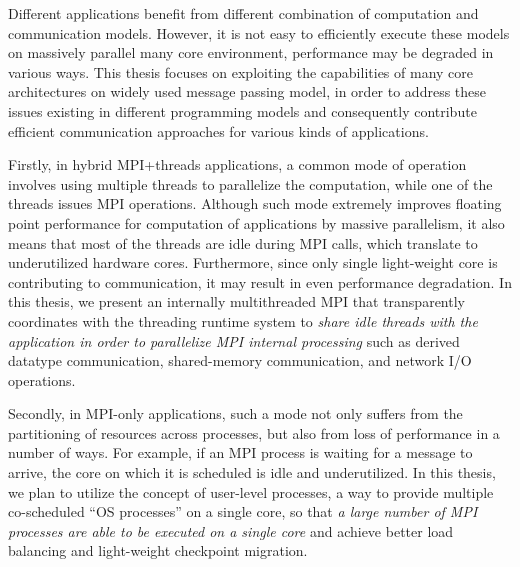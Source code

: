 Different applications benefit from different combination of computation and 
communication models. However, it is not easy to efficiently execute these models
on massively parallel many core environment, performance may be degraded in various
ways. This thesis focuses on exploiting the capabilities of many core architectures
on widely used message passing model, in order to address these issues existing 
in different programming models and consequently contribute efficient communication 
approaches for various kinds of applications. 

Firstly, in hybrid MPI+threads applications, a common mode of operation involves 
using multiple threads to parallelize the computation, while one of the threads 
issues MPI operations. Although such mode extremely improves floating point 
performance for computation of applications by massive parallelism, it also 
means that most of the threads are idle during MPI calls, which translate
to underutilized hardware cores. Furthermore, since only single light-weight core 
is contributing to communication, it may result in even performance degradation.
In this thesis, we present an internally multithreaded MPI that transparently 
coordinates with the threading runtime system to \textit{share
idle threads with the application in order to parallelize MPI internal 
processing} such as derived datatype communication, shared-memory communication, 
and network I/O operations. 

Secondly, in MPI-only applications, such a mode not only suffers from the partitioning 
of resources across processes, but also from loss of performance in a number 
of ways. For example, if an MPI process is waiting for a message to arrive, 
the core on which it is scheduled is idle and underutilized. In this thesis, 
we plan to utilize the concept of user-level 
processes, a way to provide multiple co-scheduled ``OS processes'' on a 
single core, so that \textit{a large number of MPI processes are able 
to be executed on a single core} and achieve better load balancing and 
light-weight checkpoint migration.


